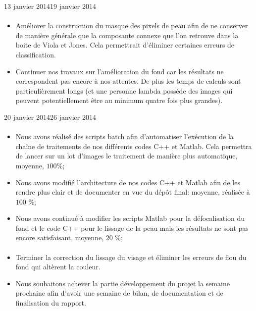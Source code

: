 \documentclass[11pt, french]{report-rd-info}
\begin{document}
\begin{fichesuivi}{13 janvier 2014}{19 janvier 2014}
\paragraph*{}
	\begin{planification}
		\begin{itemize}
			\item Améliorer la construction du masque des pixels de peau afin de ne conserver de manière générale que la composante connexe que l'on retrouve dans la boite de Viola et Jones. Cela permettrait d'éliminer certaines erreurs de classification.
			\item Continuer nos travaux sur l'amélioration du fond car les résultats ne correspondent pas encore à nos attentes. De plus les temps de calculs sont particulièrement longs (et une personne lambda possède des images qui peuvent potentiellement être au minimum quatre fois plus grandes).	
\end{itemize}
	\end{planification}
\end{fichesuivi}

\begin{fichesuivi}{20 janvier 2014}{26 janvier 2014}
\paragraph{}
	\begin{travaileffectue}
		\begin{itemize}
			\item Nous avons réalisé des scripts batch afin d'automatiser l'exécution de la chaîne de  traitements de nos différents codes C++ et Matlab. Cela permettra de lancer sur un lot d'images le traitement de manière plus automatique, moyenne, $100$\%;
			\item Nous avons modifié l'architecture de nos codes C++ et Matlab afin de les rendre plus clair et de documenter en vue du dépôt final: moyenne, réalisée à $100$ \%;
			\item Nous avons continué à modifier les scripts Matlab pour la défocalisation du fond et le code C++ pour le lissage de la peau mais les résultats ne sont pas encore satisfaisant, moyenne, $20$ \%;
		\end{itemize}
	\end{travaileffectue}


\paragraph*{}
	\begin{planification}
		\begin{itemize}
			\item Terminer la correction du lissage du visage et éliminer les erreurs de flou du fond qui altèrent la couleur.
			\item Nous souhaitons achever la partie développement du projet la semaine prochaine afin d'avoir une semaine de bilan, de documentation et de finalisation du rapport.
\end{itemize}
	\end{planification}
\end{fichesuivi}
\end{document}
